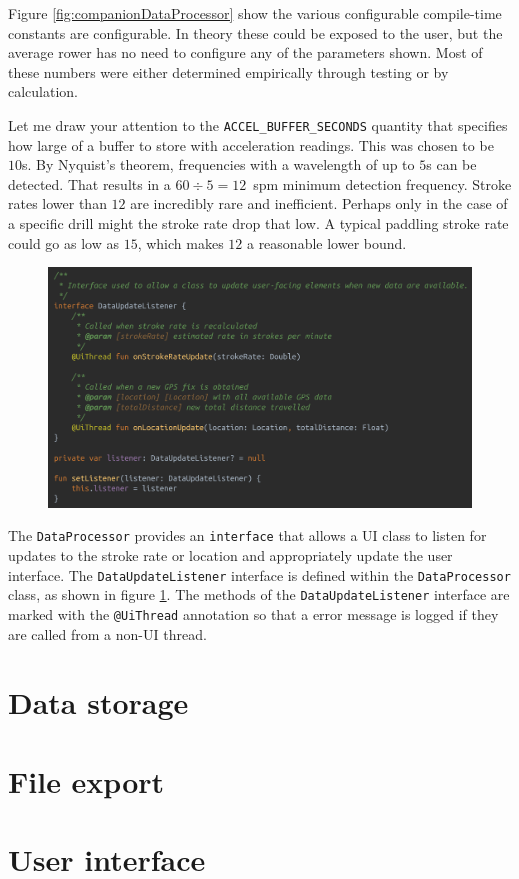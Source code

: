 \documentclass[11pt,twoside,a4paper]{report}
\begin{document}
Figure \ref{fig:companionDataProcessor} show the various configurable compile-time constants are configurable. In theory these could be exposed to the user, but the average rower has no need to configure any of the parameters shown. Most of these numbers were either determined empirically through testing or by calculation.

Let me draw your attention to the \texttt{ACCEL\_BUFFER\_SECONDS} quantity that specifies how large of a buffer to store with acceleration readings. This was chosen to be $10$\si{\second}. By Nyquist's theorem, frequencies with a wavelength of up to $5$\si{\second} can be detected. That results in a $60 \div 5 = 12$~spm minimum detection frequency. Stroke rates lower than $12$ are incredibly rare and inefficient. Perhaps only in the case of a specific drill might the stroke rate drop that low. A typical paddling stroke rate could go as low as $15$, which makes $12$ a reasonable lower bound.

\begin{figure}[h!]
  \centering
  \includegraphics[width=1.0\textwidth]{code-dataProcessor-DataUpdateListener.png}
  \caption{}
  \label{fig:DataUpdateListener}
\end{figure}

The \texttt{DataProcessor} provides an \texttt{interface} that allows a UI class to listen for updates to the stroke rate or location and appropriately update the user interface. The \texttt{DataUpdateListener} interface is defined within the \texttt{DataProcessor} class, as shown in figure \ref{fig:DataUpdateListener}. The methods of the \texttt{DataUpdateListener} interface are marked with the \texttt{@UiThread} annotation so that a error message is logged if they are called from a non-UI thread.

\section{Data storage}

\section{File export}

\section{User interface}

\printbibliography[heading=bibintoc]
\end{document}
